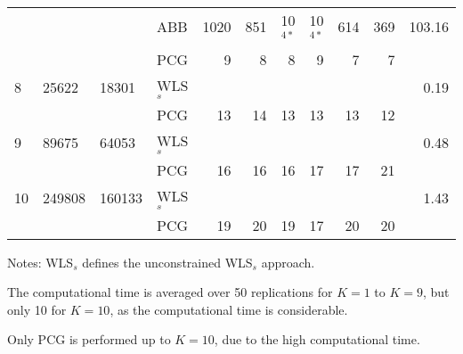 \documentclass[11pt]{article}
\newcommand{\0}{\phantom{0}}
\begin{document}
\begin{table}[ht]
\begin{threeparttable}
\begin{tabular}{llllrrrrrrr}
			& & & ABB & 1020 & 851 & 10$^{4*}$ & 10$^{4*}$ & 614 & 369 & 103.16 \\
			& & & PCG & 9 & 8 & 8 & 9 & 7 & 7 & \bm{$2.09$} \\
			\midrule
			8 & 25622 & 18301 & WLS$_{s}$ & & & & & & & 0.19 \\
			& & & PCG & 13 & 14 & 13 & 13 & 13 & 12 & \bm{$19.08$} \\
			\midrule
			9 & 89675 & 64053 & WLS$_{s}$ & & & & & & & 0.48 \\
			& & & PCG & 16 & 16 & 16 & 17 & 17 & 21 & \bm{$244.68$} \\
			\midrule
			10 & 249808 & 160133 & WLS$_{s}$ & & & & & & & 1.43 \\
			& & & PCG & 19 & 20 & 19 & 17 & 20 & 20 & \bm{$1660.12$} \\
			\bottomrule
		\end{tabular}
		\begin{tablenotes}
			\item [] Notes: WLS$_{s}$ defines the unconstrained WLS$_{s}$ approach.
			\item [] The computational time is averaged over 50 replications for $K = 1$ to $K = 9$, but only 10 for $K = 10$, as the computational time is considerable.
			\item [] Only PCG is performed up to $K = 10$, due to the high computational time.
		\end{tablenotes}
	\end{threeparttable}
\end{table}
\end{document}

